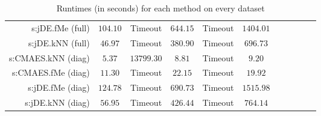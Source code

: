 \begin{table}[ht]
{\begin{tabular}{rcccccccccc}
s:jDE.fMe (full) & $104.10$ & Timeout  & $644.15$ & Timeout  & $1404.01$ \\
s:jDE.kNN (full) & $46.97$ & Timeout  & $380.90$ & Timeout  & $696.73$ \\
s:CMAES.kNN (diag) & $5.37$ & $13799.30$ & $8.81$ & Timeout  & $9.20$ \\
s:CMAES.fMe (diag) & $11.30$ & Timeout  & $22.15$ & Timeout  & $19.92$ \\
s:jDE.fMe (diag) & $124.78$ & Timeout  & $690.73$ & Timeout  & $1515.98$ \\
s:jDE.kNN (diag) & $56.95$ & Timeout  & $426.44$ & Timeout  & $764.14$ \\


\bottomrule
\end{tabular}
}
\caption{Runtimes (in seconds) for each method on every dataset} \label{tab:runtimes}
\end{table}
